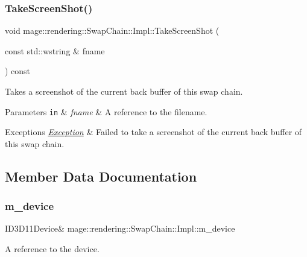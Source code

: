\subsubsection{\texorpdfstring{Take\+Screen\+Shot()}{TakeScreenShot()}}
{\footnotesize\ttfamily void mage\+::rendering\+::\+Swap\+Chain\+::\+Impl\+::\+Take\+Screen\+Shot (\begin{DoxyParamCaption}\item[{const std\+::wstring \&}]{fname }\end{DoxyParamCaption}) const}

Takes a screenshot of the current back buffer of this swap chain.


\begin{DoxyParams}[1]{Parameters}
\mbox{\tt in}  & {\em fname} & A reference to the filename. \\
\hline
\end{DoxyParams}

\begin{DoxyExceptions}{Exceptions}
{\em \mbox{\hyperlink{classmage_1_1_exception}{Exception}}} & Failed to take a screenshot of the current back buffer of this swap chain. \\
\hline
\end{DoxyExceptions}


\subsection{Member Data Documentation}
\mbox{\label{classmage_1_1rendering_1_1_swap_chain_1_1_impl_a6eff2673925babbd6dd9226dd07bf941}} 
\subsubsection{\texorpdfstring{m\+\_\+device}{m\_device}}
{\footnotesize\ttfamily I\+D3\+D11\+Device\& mage\+::rendering\+::\+Swap\+Chain\+::\+Impl\+::m\+\_\+device\hspace{0.3cm}{\ttfamily [private]}}

A reference to the device. \mbox{\label{classmage_1_1rendering_1_1_swap_chain_1_1_impl_aead0bec9edcee29c39a264dc9ea43780}} 
